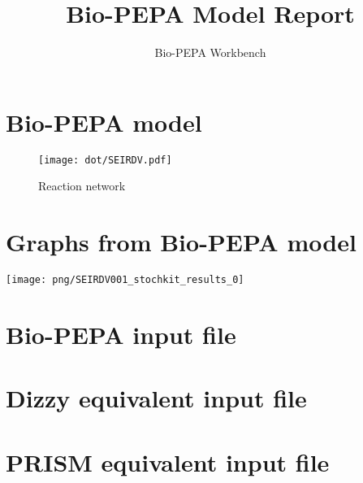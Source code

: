 \documentclass{llncs}
\title{Bio-PEPA Model Report}
\author{Bio-PEPA Workbench}
\institute{\today}
\begin{document}
\maketitle
\section{Bio-PEPA model}

\begin{figure}[htbp]
\begin{center}
\texttt{[image: dot/SEIRDV.pdf]}
\caption{Reaction network}
\end{center}
\end{figure}
\newpage
\section{Graphs from Bio-PEPA model}
\texttt{[image: png/SEIRDV001\_stochkit\_results\_0]}
\appendix
\newpage
\section{Bio-PEPA input file}

\newpage
\section{Dizzy equivalent input file}

\newpage
\section{PRISM equivalent input file}

\end{document}
